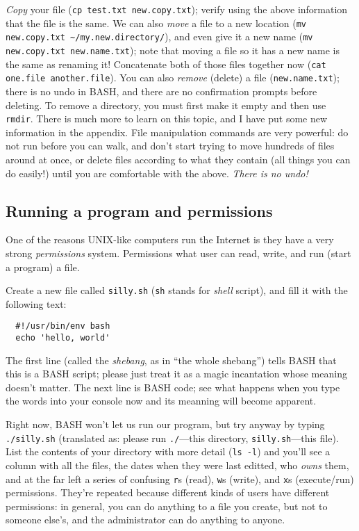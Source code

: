 \documentclass[12pt]{report}
\begin{document}
\emph{Copy} your file (\texttt{cp test.txt new.copy.txt}); verify
using the above information that the file is the same. We can also
\emph{move} a file to a new location (\texttt{mv new.copy.txt
  \textasciitilde/my.new.directory/}), and even give it a new name
(\texttt{mv new.copy.txt new.name.txt}); note that moving a file so it
has a new name is the same as renaming it! Concatenate both of those
files together now (\texttt{cat one.file another.file}). You can also
\emph{remove} (delete) a file (\texttt{new.name.txt}); there is no
undo in BASH, and there are no confirmation prompts before
deleting. To remove a directory, you must first make it empty and then
use \texttt{rmdir}. There is much more to learn on this topic, and I
have put some new information in the appendix. File manipulation
commands are very powerful: do not run before you can walk, and don't
start trying to move hundreds of files around at once, or delete files
according to what they contain (all things you can do easily!) until
you are comfortable with the above. \emph{There is no undo!}
\subsection{Running a program and permissions}
One of the reasons UNIX-like computers run the Internet is they have a
very strong \emph{permissions} system. Permissions what user can read,
write, and run (start a program) a file.

Create a new file called \texttt{silly.sh} (\texttt{sh} stands for
\emph{shell} script), and fill it with the following text:

\begin{lstlisting}
  #!/usr/bin/env bash
  echo 'hello, world'
\end{lstlisting}

The first line (called the \emph{shebang}, as in ``the whole
shebang'') tells BASH that this is a BASH script; please just treat it
as a magic incantation whose meaning doesn't matter. The next line is
BASH code; see what happens when you type the words into your console
now and its meanning will become apparent.

Right now, BASH won't let us run our program, but try anyway by typing
\texttt{./silly.sh} (translated as: please run \texttt{./}---this
directory, \texttt{silly.sh}---this file). List the contents of your
directory with more detail (\texttt{ls -l}) and you'll see a column
with all the files, the dates when they were last editted, who
\emph{owns} them, and at the far left a series of confusing
\texttt{r}s (read), \texttt{w}s (write), and \texttt{x}s (execute/run)
permissions. They're repeated because different kinds of users have
different permissions: in general, you can do anything to a file you
create, but not to someone else's, and the administrator can do
anything to anyone.
\end{document}
